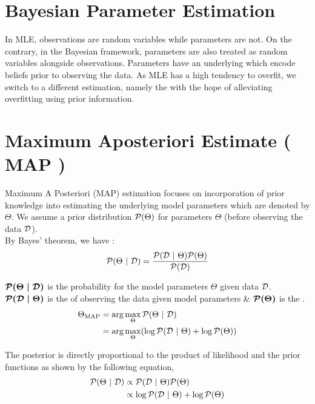 \section{Bayesian Parameter Estimation}
In MLE, observations are random variables while parameters are not. On the contrary, in the Bayesian framework, parameters are also treated as random variables alongside observations. Parameters have an underlying  which encode beliefs prior to observing the data. As MLE has a high tendency to overfit, we switch to a different estimation, namely the  with the hope of alleviating overfitting using prior information.

\section{Maximum Aposteriori Estimate ( MAP )}

Maximum A Posteriori (MAP) estimation focuses on incorporation of prior knowledge into estimating the underlying model parameters which are denoted by $\Theta$. We assume a prior distribution $\mathcal{P}(\Theta)$ for parameters $\Theta$ (before observing the data $\mathcal{D}$). \\

By Bayes' theorem, we have :
$$
  \mathcal{P}(\Theta \ | \  \mathcal{D}) = \frac{\mathcal{P}(\mathcal{D} \ | \  \Theta)\mathcal{P}(\Theta)}{\mathcal{P}(\mathcal{D})}
$$

$\bm{\mathcal{P}(\Theta \ | \  \mathcal{D})}$ is the  probability for the model parameters $\Theta$ given data $\mathcal{D}$. \\
$\bm{\mathcal{P}(\mathcal{D} \ | \  \Theta)}$ is the  of observing the data given model parameters \& $\bm{\mathcal{P}(\Theta)}$ is the .
\begin{align*}
  \Theta_{\text{MAP}} & = \arg \max\limits_{\Theta} \mathcal{P}(\Theta \ | \  \mathcal{D})                             \\
                      & = \arg \max\limits_{\Theta} ( \log \mathcal{P}(\mathcal{D} \ | \  \Theta) + \log \mathcal{P}(\Theta) )
\end{align*}

 The posterior is directly proportional to the product of likelihood and the prior functions as shown by the following equation,
\begin{align*}
  \mathcal{P}(\Theta \ | \  \mathcal{D}) & \propto  \mathcal{P}(\mathcal{D} \ | \  \Theta)  \mathcal{P}(\Theta)           \\
                       & \propto \log \mathcal{P}(\mathcal{D} \ | \  \Theta) + \log \mathcal{P}(\Theta)
\end{align*}

